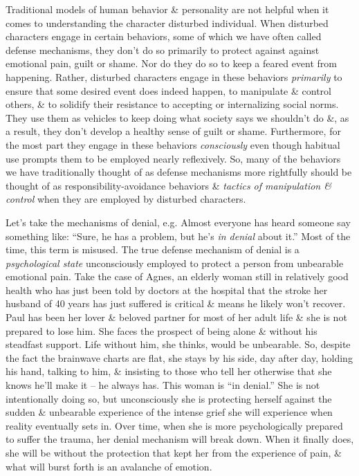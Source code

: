 \documentclass{article}
\numberwithin{equation}{section}
\begin{document}
Traditional models of human behavior \& personality are not helpful when it comes to understanding the character disturbed individual. When disturbed characters engage in certain behaviors, some of which we have often called defense mechanisms, they don't do so primarily to protect against against emotional pain, guilt or shame. Nor do they do so to keep a feared event from happening. Rather, disturbed characters engage in these behaviors \textit{primarily} to ensure that some desired event does indeed happen, to manipulate \& control others, \& to solidify their resistance to accepting or internalizing social norms. They use them as vehicles to keep doing what society says we shouldn't do \&, as a result, they don't develop a healthy sense of guilt or shame. Furthermore, for the most part they engage in these behaviors \textit{consciously} even though habitual use prompts them to be employed nearly reflexively. So, many of the behaviors we have traditionally thought of as defense mechanisms more rightfully should be thought of as responsibility-avoidance behaviors \& \textit{tactics of manipulation \& control} when they are employed by disturbed characters.

Let's take the mechanisms of denial, e.g. Almost everyone has heard someone say something like: ``Sure, he has a problem, but he's \textit{in denial} about it.'' Most of the time, this term is misused. The true defense mechanism of denial is a \textit{psychological state} unconsciously employed to protect a person from unbearable emotional pain. Take the case of Agnes, an elderly woman still in relatively good health who has just been told by doctors at the hospital that the stroke her husband of 40 years has just suffered is critical \& means he likely won't recover. Paul has been her lover \& beloved partner for most of her adult life \& she is not prepared to lose him. She faces the prospect of being alone \& without his steadfast support. Life without him, she thinks, would be unbearable. So, despite the fact the brainwave charts are flat, she stays by his side, day after day, holding his hand, talking to him, \& insisting to those who tell her otherwise that she knows he'll make it -- he always has. This woman is ``in denial.'' She is not intentionally doing so, but unconsciously she is protecting herself against the sudden \& unbearable experience of the intense grief she will experience when reality eventually sets in. Over time, when she is more psychologically prepared to suffer the trauma, her denial mechanism will break down. When it finally does, she will be without the protection that kept her from the experience of pain, \& what will burst forth is an avalanche of emotion.
\end{document}
